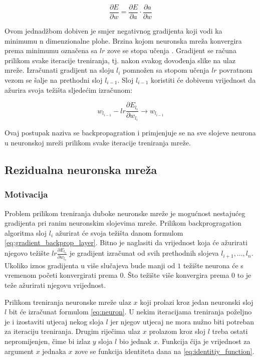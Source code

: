 \documentclass[times, utf8, zavrsni,numeric,pstricks]{fer}
\begin{document}
\begin{equation}\label{eq:graident_der}
	\frac{\partial E}{\partial w} = \frac{\partial E}{\partial a} \cdot \frac{\partial a}{\partial w}
\end{equation}

Ovom jednadžbom dobiven je smjer negativnog gradijenta koji vodi ka minimumu n dimenzionalne plohe. Brzina kojom neuronska mreža konvergira prema minimumu označena sa $lr$ zove se stopa učenja . Gradijent se računa prilikom svake iteracije treniranja, tj. nakon svakog dovođenja slike na ulaz mreže. Izračunati gradijent na sloju $l_i$ pomnožen sa stopom učenja $lr$ povratnom vezom se šalje na prethodni sloj $l_{i-1}$. Sloj $l_{i-1}$ koristiti će dobivenu vrijednost da ažurira svoja težišta sljedećim izračunom:

\begin{equation}\label{eq:gradient_backprop_layer}
	 w_{l_{i-1}} - lr \frac{\partial E_{l_i}}{\partial w_{l_i}} \rightarrow w_{l_{i-1}}
\end{equation}

Ovaj postupak naziva se backpropagration i primjenjuje se na sve slojeve neurona u neuronskoj mreži prilikom svake iteracije treniranja mreže.
 
\subsection{Rezidualna neuronska mreža}
\subsubsection{Motivacija}
Problem prilikom treniranja duboke neuronske mreže je mogućnost nestajućeg gradijenta  pri ranim neuronskim slojevima mreže. Prilikom backprogragation algoritma sloj $l_i$ ažurirat će svoja težišta danom formulom \ref{eq:gradient_backprop_layer}. Bitno je naglasiti da vrijednost koja će ažurirati njegovo težište $lr \frac{\partial E_{l_n}}{\partial w_{l_n}}$ je gradijent izračunat od svih prethodnih slojeva $l_{i+1}, ..., l_n$. Ukoliko iznos gradijenta u više slučajeva bude manji od $1$ težište neurona će s vremenom početi konvergirati prema $0$. Što težište više konvergira prema $0$ to je teže ažurirati njegovu vrijednost.

Prilikom treniranja neuronske mreže ulaz $x$ koji prolazi kroz jedan neuronski sloj $l$ bit će izračunat formulom \ref{eq:neuron}. U nekim iteracijama treniranja poželjno je i izostaviti utjecaj nekog sloja $l$ jer njegov utjecaj ne mora nužno biti potreban za iteraciju treniranja. Drugim riječima ulaz $x$ prolazom kroz sloj $l$ treba ostati nepromijenjen, čime bi izlaz $y$ sloja $l$ bio jednak $x$. Funkcija čija je vrijednost za argument $x$ jednaka $x$ zove se funkcija identiteta dana na \ref{eq:identitiy_function}.
\end{document}

